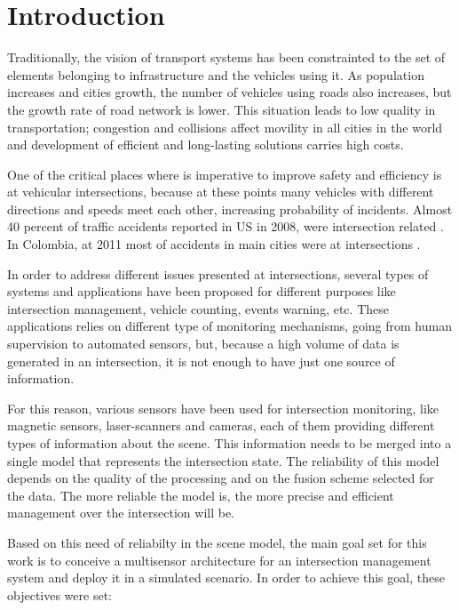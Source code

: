 \chapter*{Introduction}
%

Traditionally, the vision of transport systems has been constrainted to the set of elements belonging to infrastructure and the vehicles using it. As population increases and cities growth, the number of vehicles using roads also increases, but the growth rate of road network is lower. This situation leads to low quality in transportation; congestion and collisions affect movility in all cities in the world and development of efficient and long-lasting solutions carries high costs.

One of the critical places where is imperative to improve safety and efficiency is at vehicular intersections, because at these points many vehicles with different directions and speeds meet each other, increasing probability of incidents. Almost 40 percent of traffic accidents reported in US in 2008, were intersection related \cite{Choi2010}. In Colombia, at 2011 most of accidents in main cities were at intersections \cite{CorporacionFondodePrevencionVial2010}.

In order to address different issues presented at intersections, several types of systems and applications have been proposed for different purposes like intersection management, vehicle counting, events warning, etc. These applications relies on different type of monitoring mechanisms, going from human supervision to automated sensors, but, because a high volume of data is generated in an intersection, it is not enough to have just one source of information.

For this reason, various sensors have been used for intersection monitoring, like magnetic sensors, laser-scanners and cameras, each of them providing different types of information about the scene. This information needs to be merged into a single model that represents the intersection state. The reliability of this model depends on the quality of the processing and on the fusion scheme selected for the data. The more reliable the model is, the more precise and efficient management over the intersection will be.

Based on this need of reliabilty in the scene model, the main goal set for this work is to conceive a multisensor architecture for an intersection management system and deploy it in a simulated scenario. In order to achieve this goal, these objectives were set:

